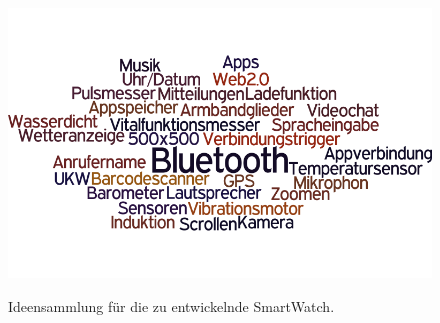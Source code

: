 \begin{appendices}
\begin{figure}[h]
\centering\
\includegraphics[width=\textwidth]{img/tagcloud}
\caption{Ideensammlung für die zu entwickelnde SmartWatch.}\label{fig:tagcloud}
\end{figure}

\end{appendices}
